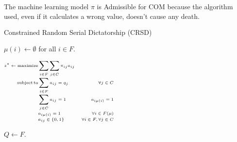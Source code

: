 The machine learning model \(\pi\) is Admissible for COM because the algorithm used, even if it calculates a wrong value, doesn’t cause any death.



\begin{algorithm}
    \caption{Constrained Random Serial Dictatorship (CRSD)}\label{alg:crsd}
    \KwResult{\(\mu\)}
    \( \mu ( i ) \leftarrow \emptyset \) for all \( i \in F \).

    \(\tiny
        \begin{aligned}
            z ^ * \leftarrow \operatorname{maximize} & \sum_{i \in F} \sum_{j \in C} \pi_{i j} a_{i j} \\[-1mm]
            \operatorname {subject}\operatorname{to} & \sum_{i \in F} a_{i j}=q_{j} & \forall j \in C \\[-1mm]
            & \sum_{j \in C} a_{i j}=1 & a_{i \mu(i)}=1 \\[-1mm]
            & a_{i\mu (i)} = 1 &  \forall i \in F(\mu) \\[-1mm]
            & a_{i j} \in\{0,1\} & \forall i \in F, \forall j \in C
        \end{aligned}
    \)%

    \( Q \leftarrow F \).

\end{algorithm}

